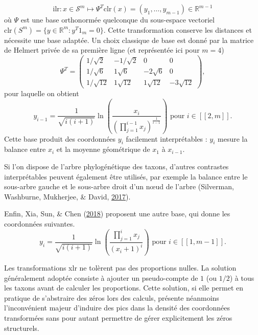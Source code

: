 \documentclass[12pt,a4paper]{reedthesis}
\newcommand \RR {\mathbb{R}}
\theoremstyle{definition}
\theoremstyle{definition}
\theoremstyle{definition}
\theoremstyle{remark}
\begin{document}
\begin{equation*}
\text{ilr}: x \in \mathcal{S}^m \mapsto \Psi^T \text{clr}(x) = \left(y_1, \ldots, y_{m-1}\right) \in \RR^{m-1} 
\end{equation*}
où \(\Psi\) est une base orthonormée quelconque du sous-espace vectoriel \(\text{clr}(S^m) = \{y \in \RR^m: y^T 1_m = 0\}\). Cette transformation conserve les distances et nécessite une base adaptée. Un choix classique de base est donné par la matrice de Helmert privée de sa première ligne (et représentée ici pour \(m = 4\))
\begin{equation*}
\Psi^T = 
\begin{pmatrix}
1/\sqrt{2} & -1/\sqrt{2} & 0 & 0 \\
1/\sqrt{6} & 1\sqrt{6}  & -2\sqrt{6} & 0 \\
1/\sqrt{12} & 1\sqrt{12}  & 1\sqrt{12} & -3\sqrt{12} 
\end{pmatrix},
\end{equation*}
pour laquelle on obtient
\begin{equation*}
y_{i-1} = \frac{1}{\sqrt{i(i+1)}} \ln\left(\frac{x_i}{\left(\prod_{j=1}^{i-1} x_j\right)^{\frac{1}{i-1}}}\right) \text{ pour } i \in [\![2,m]\!].
\end{equation*}
Cette base produit des coordonnées \(y_i\) facilement interprétables : \(y_i\) mesure la balance entre \(x_i\) et la moyenne géométrique de \(x_1\) à \(x_{i-1}\).

Si l'on dispose de l'arbre phylogénétique des taxons, d'autres contrastes interprétables peuvent également être utilisés, par exemple la balance entre le sous-arbre gauche et le sous-arbre droit d'un nœud de l'arbre (Silverman, Washburne, Mukherjee, \& David, \protect\hyperlink{ref-silverman2017phylogenetic}{2017}).

Enfin, Xia, Sun, \& Chen (\protect\hyperlink{ref-xia2018statistical}{2018}) proposent une autre base, qui donne les coordonnées suivantes.
\begin{equation*}
y_i = \frac{1}{\sqrt{i(i+1)}}\ln \left(\frac{\prod_{j=1}^i x_j}{(x_i + 1)^i}\right) \text{ pour } i \in [\![1,m-1]\!].
\end{equation*}
\newline

Les transformations xlr ne tolèrent pas des proportions nulles. La solution généralement adoptée consiste à ajouter un pseudo-compte de \(1\) (ou \(1/2\)) à tous les taxons avant de calculer les proportions. Cette solution, si elle permet en pratique de s'abstraire des zéros lors des calculs, présente néanmoins l'inconvénient majeur d'induire des pics dans la densité des coordonnées transformées sans pour autant permettre de gérer explicitement les zéros structurels.
\end{document}
